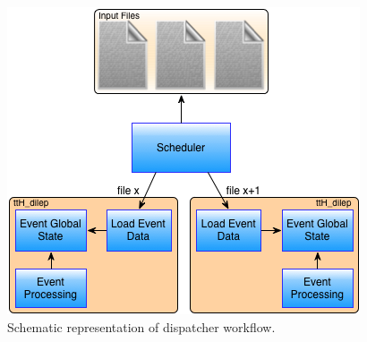 \begin{figure}[!htp]
	\begin{center}
		\includegraphics[scale=0.4]{images/scheduler_workflow.png}
		\caption{Schematic representation of dispatcher workflow.}
		\label{fig:sched_flow}
	\end{center}
\end{figure}

